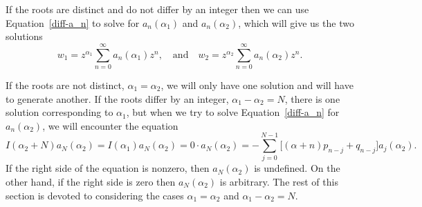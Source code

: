 If the roots are distinct and do not differ by an integer
then we can use Equation~\ref{diff-a_n} to solve for $a_n(\alpha_1)$
and $a_n(\alpha_2)$, which will give us the two solutions
\[ w_1 = z^{\alpha_1} \sum_{n=0}^\infty a_n(\alpha_1)z^n, \quad \mathrm{and} \quad
w_2 = z^{\alpha_2} \sum_{n=0}^\infty a_n(\alpha_2)z^n.\]

If the roots are not distinct, $\alpha_1 = \alpha_2$, we will only have one
solution and will have to generate another.  If the roots differ by an
integer, $\alpha_1 - \alpha_2 = N$, there is one solution corresponding
to $\alpha_1$, but when we try to solve Equation~\ref{diff-a_n} for 
$a_n(\alpha_2)$, we will encounter the equation
\[ I(\alpha_2 + N)a_N(\alpha_2) = I(\alpha_1)a_N(\alpha_2) 
= 0 \cdot a_N(\alpha_2)
= -\sum_{j=0}^{N-1}\Big[(\alpha+n)p_{n-j} + q_{n-j}\Big]a_j(\alpha_2).\]
If the right side of the equation is nonzero, then $a_N(\alpha_2)$ is
undefined.  On the other hand, 
if the right side is zero then $a_N(\alpha_2)$ is arbitrary.
The rest of this section is devoted to considering the cases 
$\alpha_1 = \alpha_2$ and $\alpha_1 - \alpha_2 = N$.

























